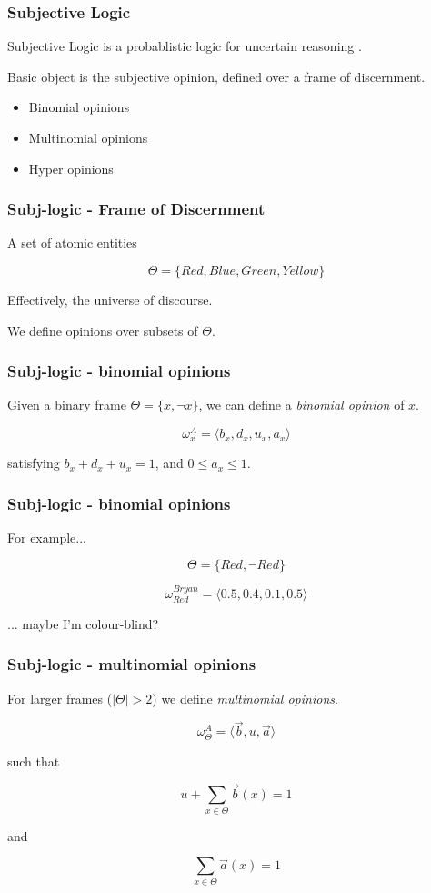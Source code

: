 \documentclass{beamer}
\begin{document}
\begin{frame}
\frametitle{Subjective Logic}

Subjective Logic is a probablistic logic for uncertain reasoning
\cite{josang_logic_2001}.

Basic object is the subjective opinion, defined over a frame of discernment.

\begin{itemize}
  \item Binomial opinions
  \item Multinomial opinions
  \item Hyper opinions \cite{josang2012interpretation}
\end{itemize}

\end{frame}

\begin{frame}
\frametitle{Subj-logic - Frame of Discernment}

A set of atomic entities

$$\Theta = \lbrace Red, Blue, Green, Yellow \rbrace$$

Effectively, the universe of discourse.

We define opinions over subsets of $\Theta$.

\end{frame}

\begin{frame}
\frametitle{Subj-logic - binomial opinions}

Given a binary frame $\Theta = \lbrace x, \lnot x \rbrace$, we can define a
\emph{binomial opinion} of $x$.

$$\omega_{x}^A = \langle b_x, d_x, u_x, a_x \rangle$$

satisfying $b_x + d_x + u_x = 1$, and $0 \leq a_x \leq 1$.

\end{frame}

\begin{frame}
\frametitle{Subj-logic - binomial opinions}

For example...

$$\Theta = \lbrace Red, \lnot Red \rbrace$$

$$\omega_{Red}^{Bryan} = \langle 0.5, 0.4, 0.1, 0.5 \rangle$$

... maybe I'm colour-blind?

\end{frame}

\begin{frame}
\frametitle{Subj-logic - multinomial opinions}

For larger frames ($|\Theta| > 2$) we define \emph{multinomial opinions}.

$$ \omega_\Theta^A = \langle \vec{b}, u, \vec{a} \rangle $$

such that

$$u + \sum_{x \in \Theta} \vec{b}(x) = 1$$

and

$$\sum_{x\in \Theta} \vec{a}(x) = 1$$

\end{frame}
\end{document}
